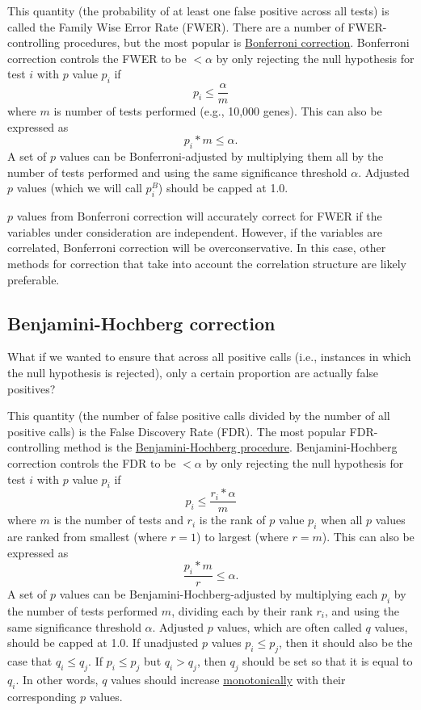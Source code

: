 \documentclass[letterpaper, 12pt]{article}
\begin{document}
This quantity (the probability of at least one false positive across all tests) is called the Family Wise Error Rate (FWER). There are a number of FWER-controlling procedures, but the most popular is \href{https://en.wikipedia.org/wiki/Bonferroni_correction}{Bonferroni correction}. Bonferroni correction controls the FWER to be $< \alpha$ by only rejecting the null hypothesis for test $i$ with $p$ value $p_i$ if
$$p_i \leq \frac{\alpha}{m}$$
where $m$ is number of tests performed (e.g., 10,000 genes). This can also be expressed as
$$p_i * m \leq \alpha.$$
A set of $p$ values can be Bonferroni-adjusted by multiplying them all by the number of tests performed and using the same significance threshold $\alpha$. Adjusted $p$ values (which we will call $p_i^{B}$) should be capped at 1.0.

$p$ values from Bonferroni correction will accurately correct for FWER if the variables under consideration are independent. However, if the variables are correlated, Bonferroni correction will be overconservative. In this case, other methods for correction that take into account the correlation structure are likely preferable.

\subsection*{Benjamini-Hochberg correction}

What if we wanted to ensure that across all positive calls (i.e., instances in which the null hypothesis is rejected), only a certain proportion are actually false positives?

This quantity (the number of false positive calls divided by the number of all positive calls) is the False Discovery Rate (FDR). The most popular FDR-controlling method is the \href{https://doi.org/10.1111/j.2517-6161.1995.tb02031.x}{Benjamini-Hochberg procedure}. Benjamini-Hochberg correction controls the FDR to be $< \alpha$ by only rejecting the null hypothesis for test $i$ with $p$ value $p_i$ if
$$p_i \leq \frac{r_i * \alpha}{m}$$
where $m$ is the number of tests and $r_i$ is the rank of $p$ value $p_i$ when all $p$ values are ranked from smallest (where $r = 1$) to largest (where $r = m$). This can also be expressed as
$$\frac{p_i * m}{r} \leq \alpha.$$
A set of $p$ values can be Benjamini-Hochberg-adjusted by multiplying each $p_i$ by the number of tests performed $m$, dividing each by their rank $r_i$, and using the same significance threshold $\alpha$. Adjusted $p$ values, which are often called $q$ values, should be capped at 1.0. If unadjusted $p$ values $p_i \leq p_j$, then it should also be the case that $q_i \leq q_j$. If $p_i \leq p_j$ but $q_i > q_j$, then $q_j$ should be set so that it is equal to $q_i$. In other words, $q$ values should increase \href{https://en.wikipedia.org/wiki/Monotonic_function}{monotonically} with their corresponding $p$ values.
\end{document}
